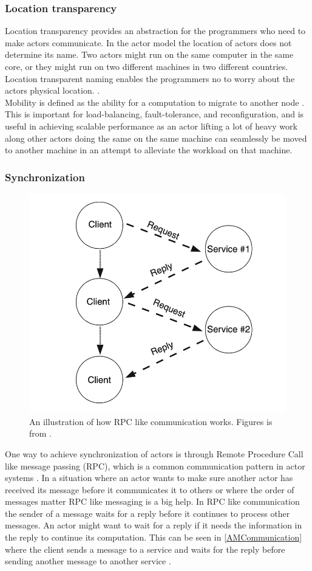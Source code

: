\subsubsection{Location transparency}
Location transparency provides an abstraction for the programmers who need to make actors communicate. In the actor model the location of actors does not determine its name. Two actors might run on the same computer in the same core, or they might run on two different machines in two different countries. Location transparent naming enables the programmers no to worry about the actors physical location. \cite{ActorModelPaper}.\\
Mobility is defined as the ability for a computation to migrate to another node \cite{ActorModelPaper}. This is important for load-balancing, fault-tolerance, and reconfiguration, and is useful in achieving scalable performance \cite{ActorModelPaper} as an actor lifting a lot of heavy work along other actors doing the same on the same machine can seamlessly be moved to another machine in an attempt to alleviate the workload on that machine.

\subsubsection{Synchronization} \label{Synchronization}
\begin{figure}[H]
	\centering
	\includegraphics[width=0.6\linewidth]{Materials/ActorModel/AMCommunication}
	\caption{An illustration of how RPC like communication works. Figures is from \cite{ActorModelPaper}.}
	\label{AMCommunication}
\end{figure}
One way to achieve synchronization of actors is through Remote Procedure Call like message passing (RPC), which is a common communication pattern in actor systems \cite{ActorModelPaper}. In a situation where an actor wants to make sure another actor has received its message before it communicates it to others or where the order of messages matter RPC like messaging is a big help. In RPC like communication the sender of a message waits for a reply before it continues to process other messages. An actor might want to wait for a reply if it needs the information in the reply to continue its computation. This can be seen in \autoref{AMCommunication} where the client sends a message to a service and waits for the reply before sending another message to another service \cite{ActorModelPaper}.\\
